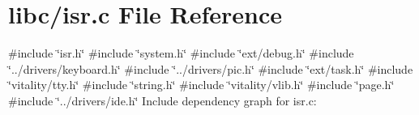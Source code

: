 \hypertarget{a00113}{}\section{libc/isr.c File Reference}
\label{a00113}
{\ttfamily \#include \char`\"{}isr.\+h\char`\"{}}\newline
{\ttfamily \#include \char`\"{}system.\+h\char`\"{}}\newline
{\ttfamily \#include \char`\"{}ext/debug.\+h\char`\"{}}\newline
{\ttfamily \#include \char`\"{}../drivers/keyboard.\+h\char`\"{}}\newline
{\ttfamily \#include \char`\"{}../drivers/pic.\+h\char`\"{}}\newline
{\ttfamily \#include \char`\"{}ext/task.\+h\char`\"{}}\newline
{\ttfamily \#include \char`\"{}vitality/tty.\+h\char`\"{}}\newline
{\ttfamily \#include \char`\"{}string.\+h\char`\"{}}\newline
{\ttfamily \#include \char`\"{}vitality/vlib.\+h\char`\"{}}\newline
{\ttfamily \#include \char`\"{}page.\+h\char`\"{}}\newline
{\ttfamily \#include \char`\"{}../drivers/ide.\+h\char`\"{}}\newline
Include dependency graph for isr.\+c\+:
